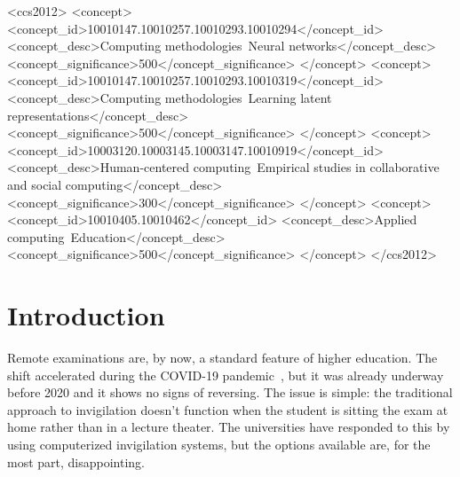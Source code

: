 \documentclass[sigconf]{acmart}
\begin{document}
\begin{CCSXML}
<ccs2012>
   <concept>
       <concept_id>10010147.10010257.10010293.10010294</concept_id>
       <concept_desc>Computing methodologies~Neural networks</concept_desc>
       <concept_significance>500</concept_significance>
   </concept>
   <concept>
       <concept_id>10010147.10010257.10010293.10010319</concept_id>
       <concept_desc>Computing methodologies~Learning latent representations</concept_desc>
       <concept_significance>500</concept_significance>
   </concept>
   <concept>
       <concept_id>10003120.10003145.10003147.10010919</concept_id>
       <concept_desc>Human-centered computing~Empirical studies in collaborative and social computing</concept_desc>
       <concept_significance>300</concept_significance>
   </concept>
   <concept>
       <concept_id>10010405.10010462</concept_id>
       <concept_desc>Applied computing~Education</concept_desc>
       <concept_significance>500</concept_significance>
   </concept>
</ccs2012>
\end{CCSXML}




\maketitle

\section{Introduction}

Remote examinations are, by now, a standard feature of higher education. The shift accelerated during the COVID-19 pandemic~\cite{coghlan2021good}, but it was already underway before 2020 and it shows no signs of reversing. The issue is simple: the traditional approach to invigilation doesn't function when the student is sitting the exam at home rather than in a lecture theater. The universities have responded to
this by using computerized invigilation systems, but the options
available are, for the most part, disappointing.
\end{document}
